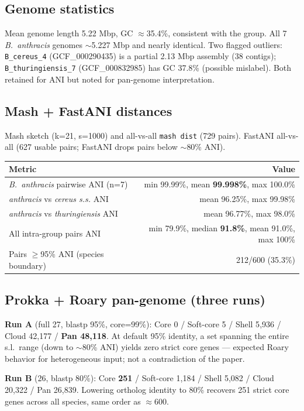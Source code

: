 \documentclass[11pt]{article}
\begin{document}
\subsection{Genome statistics}
Mean genome length 5.22 Mbp, GC $\approx$35.4\%, consistent with the group. All 7 \emph{B.\ anthracis} genomes $\sim$5.227 Mbp and nearly identical. Two flagged outliers: \texttt{B\_cereus\_4} (GCF\_000290435) is a partial 2.13 Mbp assembly (38 contigs); \texttt{B\_thuringiensis\_7} (GCF\_000832985) has GC 37.8\% (possible mislabel). Both retained for ANI but noted for pan-genome interpretation.

\subsection{Mash + FastANI distances}
Mash sketch (k=21, s=1000) and all-vs-all \texttt{mash dist} (729 pairs). FastANI all-vs-all (627 usable pairs; FastANI drops pairs below $\sim$80\% ANI).

\begin{center}\begin{tabular}{lr}\toprule
Metric & Value \\ \midrule
\emph{B.\ anthracis} pairwise ANI (n=7) & min 99.99\%, mean \textbf{99.998\%}, max 100.0\% \\
\emph{anthracis} vs \emph{cereus s.s.} ANI & mean 96.25\%, max 99.98\% \\
\emph{anthracis} vs \emph{thuringiensis} ANI & mean 96.77\%, max 98.0\% \\
All intra-group pairs ANI & min 79.9\%, median \textbf{91.8\%}, mean 91.0\%, max 100\% \\
Pairs $\ge$95\% ANI (species boundary) & 212/600 (35.3\%) \\
\bottomrule\end{tabular}\end{center}

\subsection{Prokka + Roary pan-genome (three runs)}
\textbf{Run A} (full 27, blastp 95\%, core=99\%): Core 0 / Soft-core 5 / Shell 5{,}936 / Cloud 42{,}177 / \textbf{Pan 48{,}118}. At default 95\% identity, a set spanning the entire s.l.\ range (down to $\sim$80\% ANI) yields zero strict core genes --- expected Roary behavior for heterogeneous input; not a contradiction of the paper.

\textbf{Run B} (26, blastp 80\%): Core \textbf{251} / Soft-core 1{,}184 / Shell 5{,}082 / Cloud 20{,}322 / Pan 26{,}839. Lowering ortholog identity to 80\% recovers 251 strict core genes across all species, same order as $\approx$600.
\end{document}
